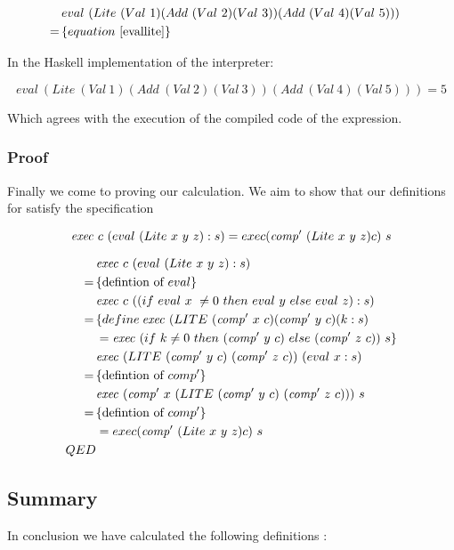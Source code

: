 \documentclass {article}
\begin{document}
\begin{align*}
&eval\ (Lite\ (Val\ 1) 
		(Add\ (Val\ 2) (Val\ 3)) 
		(Add\ (Val\ 4) (Val\ 5))) \\
=\, & \{ equation\ \ref{evallite} \}
&
\end{align*}

In the Haskell implementation of the
interpreter:

\[ eval\ (Lite\ (Val\ 1) (Add\ (Val\ 2) (Val\ 3)) (Add\ (Val\ 4) (Val\ 5)))  = 5\]


Which agrees with the execution of the 
compiled code of the expression.

\subsubsection{Proof}

Finally we come to proving our calculation.
We aim to show that our definitions for \lite
satisfy the specification

\[ \mathit{exec\ } c\ (eval\ (Lite\ x\ y\ z):s) = exec (\mathit{comp'\ }  (Lite\ x\ y\ z) c)\ s  \]

\begin{align*}
&\Exec c\ (eval\ (Lite\ x\ y\ z):s) \\
=\, & \{ \mbox{defintion of}\ eval \} \\
&\Exec c\ ((if\ eval\ x\ \not= 0\ then\ eval\ y\ else\ eval\ z) :s) \\
=\, & \{ define\: \Exec (LITE\ (\Compp  x\ c) (\Compp  y\ c) (k : s) \\
&= \Exec (if\ k \not=0\ then\ (\Compp  y\ c)\ else\ (\Compp  z\ c))\ s \} \\
& \Exec (LITE\ (\Compp  y\ c)\ (\Compp  z\ c))\ (eval\ x : s) \\
=\, & \{ \mbox{defintion of}\ comp' \} \\
& \Exec (\Compp  x\ (LITE\ (\Compp  y\ c)\ (\Compp  z\ c)))\ s \\
=\, & \{\mbox{defintion of}\ comp' \} \\
&= exec (\Compp  (Lite\ x\ y\ z) c)\ s \\
QED
\end{align*}

\subsection{Summary}

In conclusion we have calculated the following definitions
												\cite[page 11]{bandh}:
\end{document}
